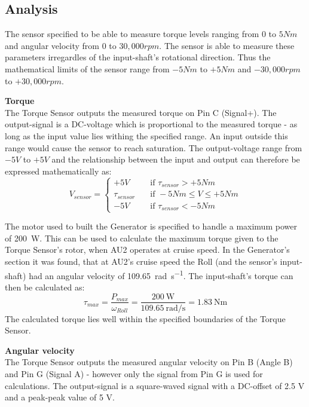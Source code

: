 \subsection{Analysis}
The sensor specified to be able to measure torque levels ranging from $0$ to $5 Nm$ and angular velocity from $0$ to $30,000 rpm$. The sensor is able to measure these parameters irregardles of the input-shaft's rotational direction. Thus the mathematical limits of the sensor range from $-5 Nm$ to $+5 Nm$ and $-30,000 rpm$ to $+30,000 rpm$.

\textbf{Torque}\\
The Torque Sensor outputs the measured torque on Pin C (Signal+). The output-signal is a DC-voltage which is proportional to the measured torque - as long as the input value lies withing the specified range. An input outside this range would cause the sensor to reach saturation. The output-voltage range from $-5 V$ to $+5 V$ and the relationship between the input and output can therefore be expressed mathematically as:
\begin{equation}
	V_{sensor} = 
	\begin{cases}
		+5V				& \quad \text{if } \tau_{sensor} > +5 Nm\\
		\tau_{sensor}   & \quad \text{if } -5 Nm \leq V \leq +5 Nm\\
		-5V				& \quad \text{if } \tau_{sensor} < -5 Nm
	\end{cases}
\end{equation}

The motor used to built the Generator is specified to handle a maximum power of \SI{200}{\watt}. This can be used to calculate the maximum torque given to the Torque Sensor's rotor, when AU2 operates at cruise speed. In the Generator's section it was found, that at AU2's cruise speed the Roll (and the sensor's input-shaft) had an angular velocity of \SI[per-mode=fraction]{109.65}{\radian \per \second}. The input-shaft's torque can then be calculated as:
\begin{equation}
	\tau_{max} = \frac{P_{max}}{\omega_{Roll}} = \frac{\SI{200}{\watt}}{\SI[per-mode=fraction]{109.65}{\radian \per \second}} = \SI{1.83}{\newton \meter}
\end{equation}
The calculated torque lies well within the specified boundaries of the Torque Sensor.

\textbf{Angular velocity}\\
The Torque Sensor outputs the measured angular velocity on Pin B (Angle B) and Pin G (Signal A) - however only the signal from Pin G is used for calculations. The output-signal is a square-waved signal with a DC-offset of 2.5 V and a peak-peak value of 5 V.

